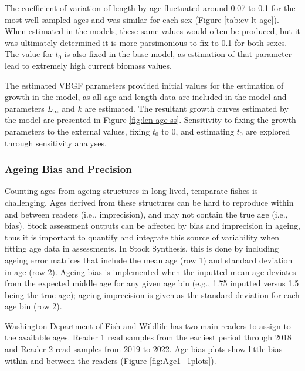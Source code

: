 \documentclass[11pt,
  english,
  letterpaper,
]{article}
\begin{document}
\vspace{0.5cm}

The coefficient of variation of length by age fluctuated around 0.07 to 0.1 for the most well sampled ages and was similar for each sex (Figure \ref{tab:cv-lt-age}). When estimated in the models, these same values would often be produced, but it was ultimately determined it is more parsimonious to fix to 0.1 for both sexes. The value for \(t_0\) is also fixed in the base model, as estimation of that parameter lead to extremely high current biomass values.

The estimated VBGF parameters provided initial values for the estimation of growth in the model, as all age and length data are included in the model and parameters \(L_{\infty}\) and \(k\) are estimated. The resultant growth curves estimated by the model are presented in Figure \ref{fig:len-age-ss}. Sensitivity to fixing the growth parameters to the external values, fixing \(t_0\) to 0, and estimating \(t_0\) are explored through sensitivity analyses.

\hypertarget{ageing-bias-and-precision}{%
\subsubsection{Ageing Bias and Precision}\label{ageing-bias-and-precision}}

Counting ages from ageing structures in long-lived, temparate fishes is challenging. Ages derived from these structures can be hard to reproduce within and between readers (i.e., imprecision), and may not contain the true age (i.e., bias). Stock assessment outputs can be affected by bias and imprecision in ageing, thus it is important to quantify and integrate this source of variability when fitting age data in assessments. In Stock Synthesis, this is done by including ageing error matrices that include the mean age (row 1) and standard deviation in age (row 2). Ageing bias is implemented when the inputted mean age deviates from the expected middle age for any given age bin (e.g., 1.75 inputted versus 1.5 being the true age); ageing imprecision is given as the standard deviation for each age bin (row 2).

Washington Department of Fish and Wildlife has two main readers to assign to the available ages. Reader 1 read samples from the earliest period through 2018 and Reader 2 read samples from 2019 to 2022. Age bias plots show little bias within and between the readers (Figure \ref{fig:Age1_1plots}).
\end{document}
